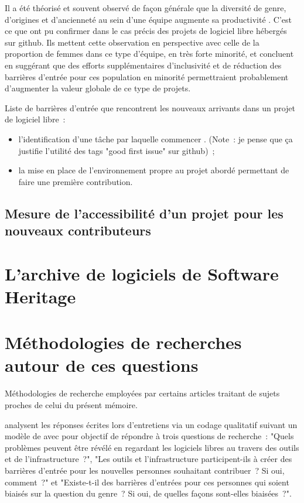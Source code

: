 Il a été théorisé et souvent observé de façon générale que la diversité de genre, d'origines et d'ancienneté
au sein d'une équipe augmente sa productivité . C'est ce que
 ont pu confirmer dans le cas précis des projets de logiciel libre hébergés sur
\gls{github}. Ils mettent cette observation en perspective avec celle de la proportion de
femmes dans ce type d'équipe, en très forte minorité, et concluent en suggérant que des efforts
supplémentaires d'inclusivité et de réduction des barrières d'entrée pour ces population en minorité
permettraient probablement d'augmenter la valeur globale de ce type de projets.

Liste de barrières d'entrée que rencontrent les nouveaux arrivants dans un projet de logiciel libre :

\begin{itemize}
    \item l'identification d'une tâche par laquelle commencer . (Note : je
        pense que ça justifie l'utilité des tags "good first issue" sur \gls{github}) ;
    \item la mise en place de l'environnement propre au projet abordé permettant de faire une première
        contribution. 
\end{itemize}

\subsection{Mesure de l'accessibilité d'un projet pour les nouveaux contributeurs}


\section{L'archive de logiciels de Software Heritage}


\section{Méthodologies de recherches autour de ces questions}

Méthodologies de recherche employées par certains articles traitant de sujets proches de celui du présent
mémoire.

\textcite[p.~1006]{barriers-2018} analysent les réponses écrites lors d'entretiens via un codage
qualitatif suivant un modèle de  avec pour objectif de répondre à trois questions
de recherche : "Quels problèmes peuvent être révélé en regardant les logiciels libres au travers des outils et
de l'infrastructure ?", "Les outils et l'infrastructure participent-ils à créer des barrières d'entrée pour
les nouvelles personnes souhaitant contribuer ? Si oui, comment ?" et "Existe-t-il des barrières d'entrées
pour ces personnes qui soient biaisés sur la question du genre ? Si oui, de quelles façons sont-elles
biaisées ?".

